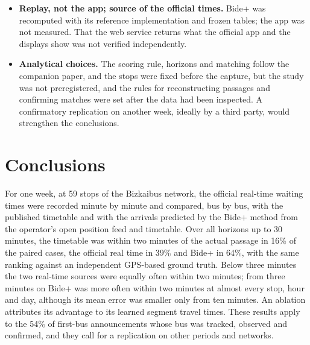 \begin{itemize}
        estimated, and other seasons, networks or operators may differ.
  \item \textbf{Replay, not the app; source of the official times.} Bide+ was recomputed with its reference implementation
        and frozen tables; the app was not measured. That the web service returns what the official app and the displays
        show was not verified independently.
  \item \textbf{Analytical choices.} The scoring rule, horizons and matching follow the companion paper, and the stops were
        fixed before the capture, but the study was not preregistered, and the rules for reconstructing passages and
        confirming matches were set after the data had been inspected. A confirmatory replication on another week, ideally
        by a third party, would strengthen the conclusions.
\end{itemize}

\section{Conclusions}
\label{sec:conclusions}

For one week, at 59 stops of the Bizkaibus network, the official real-time waiting times were recorded minute by minute and
compared, bus by bus, with the published timetable and with the arrivals predicted by the Bide+ method from the operator's
open position feed and timetable. Over all horizons up to 30 minutes, the timetable was within two minutes of the actual
passage in 16\% of the paired cases, the official real time in 39\% and Bide+ in 64\%, with the same ranking against an
independent GPS-based ground truth. Below three minutes the two real-time sources were equally often within two minutes;
from three minutes on Bide+ was more often within two minutes at almost every stop, hour and day, although its mean error
was smaller only from ten minutes. An ablation attributes its advantage to its learned segment travel times. These results
apply to the 54\% of first-bus announcements whose bus was tracked, observed and confirmed, and they call for a replication on other periods
and networks.

